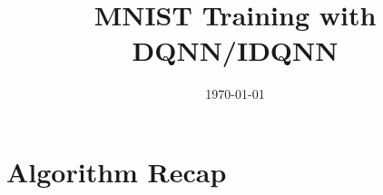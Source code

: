 \documentclass[aspectratio=169]{beamer}
\title{MNIST Training with DQNN/IDQNN}
\author{}
\institute{Quantum Machine Learning}
\date{\today}
\begin{document}
\begin{frame}
  \maketitle
\end{frame}



\section{Algorithm Recap}
\end{document}
